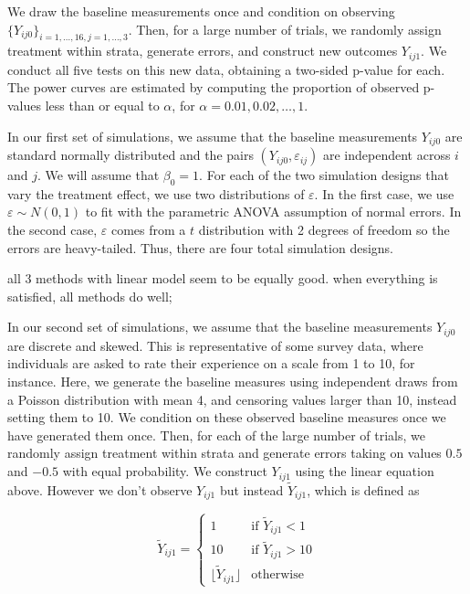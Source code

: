 \documentclass[11pt]{article}
\newcommand{\todo}[1]{{\color{red}{TO DO: \sc #1}}}
\begin{document}
We draw the baseline measurements once and condition on observing $\{ Y_{ij0}\}_{i = 1,\dots,16, j = 1,\dots, 3}$.
Then, for a large number of trials, we randomly assign treatment within strata, generate errors, and construct new outcomes $Y_{ij1}$.
We conduct all five tests on this new data, obtaining a two-sided p-value for each.
The power curves are estimated by computing the proportion of observed p-values less than or equal to $\alpha$, for $\alpha = 0.01, 0.02, \dots, 1$.

In our first set of simulations, we assume that the baseline measurements $Y_{ij0}$ are standard normally distributed and the pairs $(Y_{ij0}, \varepsilon_{ij})$ are independent across $i$ and $j$.
We will assume that $\beta_0 = 1$.
For each of the two simulation designs that vary the treatment effect, we use two distributions of $\varepsilon$.
In the first case, we use $\varepsilon \sim N(0, 1)$ to fit with the parametric ANOVA assumption of normal errors.
In the second case, $\varepsilon$ comes from a $t$ distribution with 2 degrees of freedom so the errors are heavy-tailed.
Thus, there are four total simulation designs.

\todo{Summary of results for normal sims}
all 3 methods with linear model seem to be equally good. when everything is satisfied, all methods do well; 
 


In our second set of simulations, we assume that the baseline measurements $Y_{ij0}$ are discrete and skewed.
This is representative of some survey data, where individuals are asked to rate their experience on a scale from 1 to 10, for instance.
Here, we generate the baseline measures using independent draws from a Poisson distribution with mean 4, and censoring values larger than 10, instead setting them to 10.
We condition on these observed baseline measures once we have generated them once.
Then, for each of the large number of trials, we randomly assign treatment within strata and generate errors taking on values $0.5$ and $-0.5$ with equal probability.
We construct $Y_{ij1}$ using the linear equation above.
However we don't observe $Y_{ij1}$ but instead $\tilde{Y}_{ij1}$, which is defined as 

\begin{displaymath}
   \tilde{Y}_{ij1} = \left\{
     \begin{array}{ll}
       1 & \text{if } \tilde{Y}_{ij1} < 1\\
       10 & \text{if } \tilde{Y}_{ij1} > 10 \\
       \lfloor \tilde{Y}_{ij1} \rfloor & \text{otherwise}
     \end{array}
   \right.
\end{displaymath}
\end{document}
